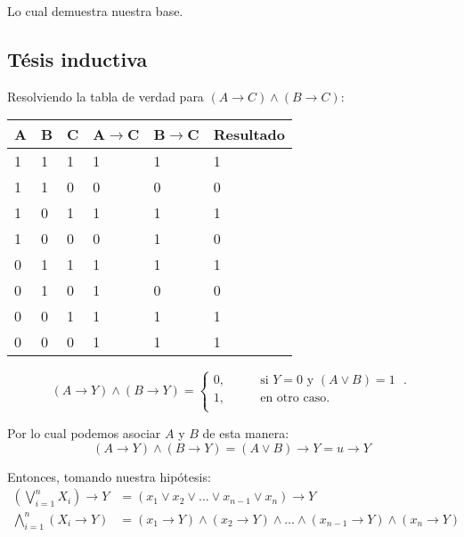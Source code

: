 Lo cual demuestra nuestra base.


\subsection{Tésis inductiva}


Resolviendo la tabla de verdad para $(A \rightarrow C) \wedge (B \rightarrow C)$:\\
\begin{center}
\begin{tabular}{| l | l | l | l | l | l |}
	A	&B	&C	&A$\rightarrow$C	&B$\rightarrow$C	&Resultado\\
	\hline
	1       &1       &1       &1       &1       &1\\
	1       &1       &0       &0       &0       &0\\
	1       &0       &1       &1       &1       &1\\
	1       &0       &0       &0       &1       &0\\
	0       &1       &1       &1       &1       &1\\
	0       &1       &0       &1       &0       &0\\
	0       &0       &1       &1       &1       &1\\
	0       &0       &0       &1       &1       &1\\
\end{tabular}
\end{center}


\[ (A \rightarrow Y) \wedge (B \rightarrow Y) =
 \begin{cases}
 0, 	\qquad& \text{si $Y=0$ y $(A\vee B) = 1$ }.\\
 1,	 	\qquad& \text{en otro caso}.\\
\end{cases} \]

Por lo cual podemos asociar $A$ y $B$ de esta manera:
\begin{equation}
(A \rightarrow Y) \wedge (B \rightarrow Y) = (A\vee B) \rightarrow Y = u \rightarrow Y
\end{equation}\label{EQ:ANDATORIA_PROPIEDAD_1}

Entonces, tomando nuestra hipótesis:
\begin{align}
\left(\bigvee\limits_{i=1}^{n}X_i\right)\rightarrow Y &= (x_1\vee x_2\vee \ldots \vee x_{n-1} \vee x_n)\rightarrow Y\label{EQ:ORATORIA_TI_1}\\
\bigwedge\limits_{i=1}^{n}(X_i\rightarrow Y) &= (x_1\rightarrow Y) \wedge (x_2\rightarrow Y) \wedge \ldots \wedge (x_{n-1}\rightarrow Y) \wedge (x_n\rightarrow Y) \label{EQ:ANDATORIA_TI_1}
\end{align}

